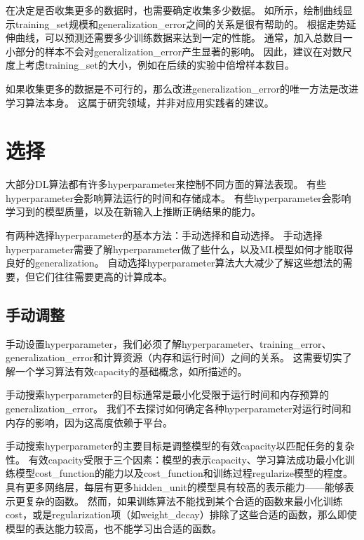在决定是否收集更多的数据时，也需要确定收集多少数据。
如所示，绘制曲线显示\gls{training_set}规模和\gls{generalization_error}之间的关系是很有帮助的。
根据走势延伸曲线，可以预测还需要多少训练数据来达到一定的性能。
通常，加入总数目一小部分的样本不会对\gls{generalization_error}产生显著的影响。
因此，建议在对数尺度上考虑\gls{training_set}的大小，例如在后续的实验中倍增样本数目。


如果收集更多的数据是不可行的，那么改进\gls{generalization_error}的唯一方法是改进学习算法本身。
这属于研究领域，并非对应用实践者的建议。

\section{选择}
\label{sec:selecting_hyperparameters}
大部分\gls{DL}算法都有许多\gls{hyperparameter}来控制不同方面的算法表现。
有些\gls{hyperparameter}会影响算法运行的时间和存储成本。
有些\gls{hyperparameter}会影响学习到的模型质量，以及在新输入上推断正确结果的能力。


有两种选择\gls{hyperparameter}的基本方法：手动选择和自动选择。
手动选择\gls{hyperparameter}需要了解\gls{hyperparameter}做了些什么，以及\gls{ML}模型如何才能取得良好的\gls{generalization}。
自动选择\gls{hyperparameter}算法大大减少了解这些想法的需要，但它们往往需要更高的计算成本。


\subsection{手动调整}
\label{sec:manual_hyperparameter_tuning}
手动设置\gls{hyperparameter}，我们必须了解\gls{hyperparameter}、\gls{training_error}、\gls{generalization_error}和计算资源（内存和运行时间）之间的关系。
这需要切实了解一个学习算法有效\gls{capacity}的基础概念，如所描述的。


手动搜索\gls{hyperparameter}的目标通常是最小化受限于运行时间和内存预算的\gls{generalization_error}。
我们不去探讨如何确定各种\gls{hyperparameter}对运行时间和内存的影响，因为这高度依赖于平台。


手动搜索\gls{hyperparameter}的主要目标是调整模型的有效\gls{capacity}以匹配任务的复杂性。
有效\gls{capacity}受限于三个因素：模型的表示\gls{capacity}、学习算法成功最小化训练模型\gls{cost_function}的能力以及\gls{cost_function}和训练过程\gls{regularize}模型的程度。
具有更多网络层，每层有更多\gls{hidden_unit}的模型具有较高的表示能力——能够表示更复杂的函数。
然而，如果训练算法不能找到某个合适的函数来最小化训练\gls{cost}，或是\gls{regularization}项（如\gls{weight_decay}）排除了这些合适的函数，那么即使模型的表达能力较高，也不能学习出合适的函数。%

